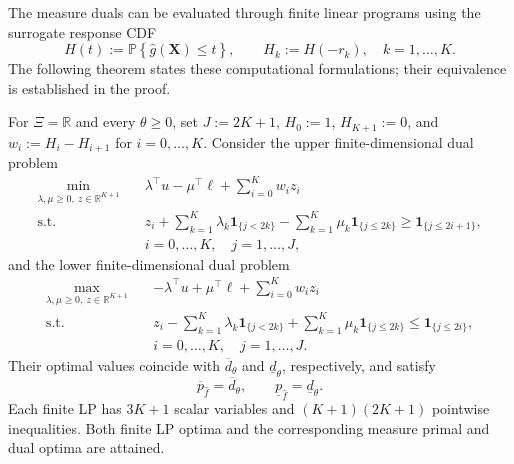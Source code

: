 The measure duals can be evaluated through finite linear programs using the surrogate response CDF
\begin{equation}
  H(t):=\mathbb P\left\{\hat g(\bm X)\le t\right\},\qquad
  H_k:=H(-r_k),\quad k=1,\ldots,K.
  \label{eq-surrogate-response-cdf}
\end{equation}
The following theorem states these computational formulations; their equivalence is established in the proof.

\begin{theorem}
  \label{thm-finite-dual-reformulations}
  For $\Xi=\mathbb R$ and every $\theta\ge0$, set $J:=2K+1$, $H_0:=1$, $H_{K+1}:=0$, and $w_i:=H_i-H_{i+1}$ for $i=0,\ldots,K$. Consider the upper finite-dimensional dual problem
  \begin{equation}
    \begin{aligned}
      \min_{\lambda,\mu\ge0,\ z\in\mathbb R^{K+1}}\quad&
      \lambda^\top u-\mu^\top\ell+\sum_{i=0}^K w_i z_i\\
      \text{s.t.}\quad&
      z_i+\sum_{k=1}^K\lambda_k\mathbf1_{\{j<2k\}}
      -\sum_{k=1}^K\mu_k\mathbf1_{\{j\le2k\}}
      \ge\mathbf1_{\{j\le2i+1\}},\\
      &i=0,\ldots,K,\quad j=1,\ldots,J,
    \end{aligned}
    \label{eq-finite-upper-dual}
  \end{equation}
  and the lower finite-dimensional dual problem
  \begin{equation}
    \begin{aligned}
      \max_{\lambda,\mu\ge0,\ z\in\mathbb R^{K+1}}\quad&
      -\lambda^\top u+\mu^\top\ell+\sum_{i=0}^K w_i z_i\\
      \text{s.t.}\quad&
      z_i-\sum_{k=1}^K\lambda_k\mathbf1_{\{j<2k\}}
      +\sum_{k=1}^K\mu_k\mathbf1_{\{j\le2k\}}
      \le\mathbf1_{\{j\le2i\}},\\
      &i=0,\ldots,K,\quad j=1,\ldots,J.
    \end{aligned}
    \label{eq-finite-lower-dual}
  \end{equation}
  Their optimal values coincide with $\overline d_\theta$ and $\underline d_\theta$, respectively, and satisfy
  \begin{equation}
    \overline p_{\hat f}=\overline d_\theta,\qquad
    \underline p_{\hat f}=\underline d_\theta.
    \label{eq-strong-duality}
  \end{equation}
  Each finite LP has $3K+1$ scalar variables and $(K+1)(2K+1)$ pointwise inequalities. Both finite LP optima and the corresponding measure primal and dual optima are attained.
\end{theorem}
